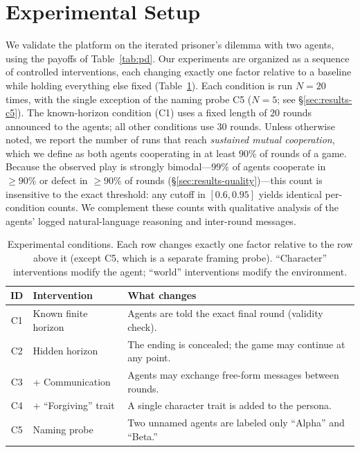 \section{Experimental Setup}
\label{sec:setup}

We validate the platform on the iterated prisoner's dilemma with two agents, using the payoffs of Table~\ref{tab:pd}. Our experiments are organized as a sequence of controlled interventions, each changing exactly one factor relative to a baseline while holding everything else fixed (Table~\ref{tab:conditions}). Each condition is run $N=20$ times, with the single exception of the naming probe C5 ($N=5$; see \S\ref{sec:results-c5}). The known-horizon condition (C1) uses a fixed length of $20$ rounds announced to the agents; all other conditions use $30$ rounds. Unless otherwise noted, we report the number of runs that reach \emph{sustained mutual cooperation}, which we define as both agents cooperating in at least $90\%$ of rounds of a game. Because the observed play is strongly bimodal---$99\%$ of agents cooperate in $\ge 90\%$ or defect in $\ge 90\%$ of rounds (\S\ref{sec:results-quality})---this count is insensitive to the exact threshold: any cutoff in $[0.6, 0.95]$ yields identical per-condition counts. We complement these counts with qualitative analysis of the agents' logged natural-language reasoning and inter-round messages.

\begin{table}[t]
  \caption{Experimental conditions. Each row changes exactly one factor relative to the row above it (except C5, which is a separate framing probe). ``Character'' interventions modify the agent; ``world'' interventions modify the environment.}
  \label{tab:conditions}
  \begin{tabular}{@{}clp{4.6cm}@{}}
    \toprule
    ID & Intervention & What changes \\
    \midrule
    C1 & Known finite horizon & Agents are told the exact final round (validity check). \\
    C2 & Hidden horizon & The ending is concealed; the game may continue at any point. \\
    C3 & + Communication & Agents may exchange free-form messages between rounds. \\
    C4 & + ``Forgiving'' trait & A single character trait is added to the persona. \\
    C5 & Naming probe & Two unnamed agents are labeled only ``Alpha'' and ``Beta.'' \\
    \bottomrule
  \end{tabular}
\end{table}

